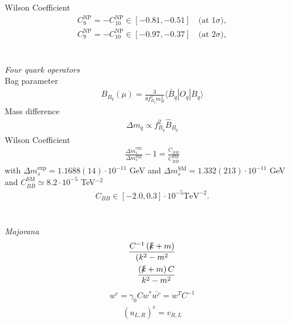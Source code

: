 Wilson Coefficient \cite{150306199} \cite{1608.07832}
\begin{align}
 C_9^\text{NP} = -C_{10}^\text{NP} \in [-0.81,-0.51]\quad \text{(at 1}\sigma),\\
 C_9^\text{NP} = -C_{10}^\text{NP} \in [-0.97,-0.37]\quad \text{(at 2}\sigma),
 \label{eq_mumuBound}
\end{align}
\\ \\ \textit{Four quark operators}\\
Bag parameter \cite{1607.00299}
\begin{align}
 B_{B_q}(\mu) = \frac{3}{8f_{B_q}^2 m_B^2} \langle \bar B_q |O_q|B_q \rangle
\end{align}
Mass difference \cite{1102.0009}
\begin{align}
 \Delta m_q \propto f^2_{B_q} \hat{B}_{B_q}
\end{align}
Wilson Coefficient
\begin{align}
 \frac{\Delta m_s^\text{exp}}{\Delta m_s^\text{SM}}-1 = \frac{C_{B\bar B}}{C^\text{SM}_{B\bar B}}
\end{align}
with $\Delta m_s^\text{exp} = 1.1688(14) \cdot 10^{-11}$ GeV \cite{PDG} \cite{1602.03560} and $\Delta m_s^\text{SM} = 1.332(213)\cdot 10^{-11}$ GeV \cite{0612167}%
and $C_{B\bar B}^\text{SM} \simeq 8.2\cdot 10^{-5}$ TeV$^{-2}$ 
\begin{align}
 C_{BB} \in [-2.0,0.3] \cdot 10^{-5} \text{TeV}^{-2}.%
 \label{eq_mixBound}
\end{align}
\\ \\ \textit{Majorana}\\
\begin{equation}
\begin{aligned}
 \frac{C^{-1}\left(\slashed{k}+m\right)}{(k^2-m^2}\\
 \frac{\left(\slashed{k}+m\right)C}{k^2-m^2}
\end{aligned}
\label{eq_majoProp}
\end{equation}
\begin{equation}
\begin{aligned}
 w^c = \gamma_0 C w^*
 \bar {w^c}= w^T C^{-1}
\end{aligned}
\label{eq_ChargeConj}
\end{equation}
\cite{Fierz}
\begin{align}
 \left(u_{L,R}\right)^c = v_{R,L}
\end{align}



